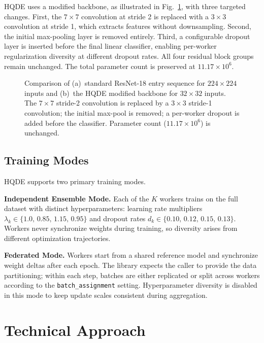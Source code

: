\documentclass[journal,twoside]{IEEEtran}
\newcommand{\hqde}{\mbox{HQDE}\xspace}
\begin{document}
\hqde{} uses a modified backbone, as illustrated in Fig.~\ref{fig:resnet},
with three targeted changes. First, the $7\times7$ convolution at
stride 2 is replaced with a $3\times3$ convolution at stride 1, which
extracts features without downsampling. Second, the initial max-pooling
layer is removed entirely. Third, a configurable dropout layer is
inserted before the final linear classifier, enabling per-worker
regularization diversity at different dropout rates. All four residual
block groups remain unchanged. The total parameter count is preserved
at $11.17\times10^6$.

\begin{figure}[!t]
\centering
\vspace{4cm}
\caption{Comparison of (a)~standard ResNet-18 entry sequence for
$224\times224$ inputs and (b)~the \hqde{} modified backbone for
$32\times32$ inputs. The $7\times7$ stride-2 convolution is replaced
by a $3\times3$ stride-1 convolution; the initial max-pool is removed;
a per-worker dropout is added before the classifier. Parameter count
($11.17\times10^6$) is unchanged.}
\label{fig:resnet}
\end{figure}

\subsection{Training Modes}

\hqde{} supports two primary training modes.

\textbf{Independent Ensemble Mode.} Each of the $K$ workers trains on
the full dataset with distinct hyperparameters: learning rate
multipliers $\lambda_k \in \{1.0,\,0.85,\,1.15,\,0.95\}$ and dropout
rates $d_k \in \{0.10,\,0.12,\,0.15,\,0.13\}$. Workers never
synchronize weights during training, so diversity arises from different
optimization trajectories.

\textbf{Federated Mode.} Workers start from a shared reference model and
synchronize weight deltas after each epoch. The library expects the
caller to provide the data partitioning; within each step, batches are
either replicated or split across workers according to the
\texttt{batch\_assignment} setting. Hyperparameter diversity is disabled
in this mode to keep update scales consistent during aggregation.

\section{Technical Approach}
\label{sec:method}
\end{document}
